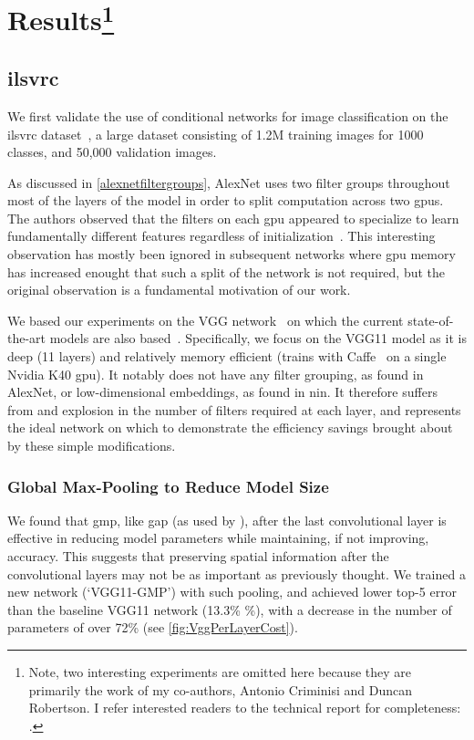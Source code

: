 \documentclass[thesis]{subfiles}
\begin{document}
	\section[Results]{Results\protect\footnote{Note, two interesting experiments are omitted here because they are primarily the work of my co-authors, Antonio Criminisi and Duncan Robertson. I refer interested readers to the technical report for completeness: \citet{Ioannou2015}.}}
	\subsection{\acrshort{ilsvrc}}
	We first validate the use of conditional networks for image classification on the \gls{ilsvrc} dataset~\citep{ILSVRC2015}, a large dataset consisting of 1.2M training images for 1000 classes, and 50,000 validation images.
	
	As discussed in \cref{alexnetfiltergroups}, AlexNet uses two filter groups throughout most of the layers of the model in order to split computation across two \gls{gpu}s. The authors observed that the filters on each \gls{gpu} appeared to specialize to learn fundamentally different features regardless of initialization~\citep{Krizhevsky2012}. This interesting observation has mostly been ignored in subsequent networks where \gls{gpu} memory has increased enought that such a split of the network is not required, but the original observation is a fundamental motivation of our work.
	
	We based our experiments on the VGG network~\citep{Simonyan2014verydeep} on which the current state-of-the-art models are also based~\citep{He2015b}. Specifically, we focus on the VGG11 model as it is deep (11 layers) and relatively memory efficient (trains with Caffe~\citep{Jia2014} on a single Nvidia K40 \gls{gpu}). It notably does not have any filter grouping, as found in AlexNet, or low-dimensional embeddings, as found in \gls{nin}. It therefore suffers from and explosion in the number of filters required at each layer, and represents the ideal network on which to demonstrate the efficiency savings brought about by these simple modifications.
	
	\subsubsection{Global Max-Pooling to Reduce Model Size}
	We found that \gls{gmp}, like \gls{gap} (as used by \citet{Lin2013NiN,Szegedy2014going}), after the last convolutional layer is effective in reducing model parameters while maintaining, if not improving, accuracy. This suggests that preserving spatial information after the convolutional layers may not be as important as previously thought. 
	We trained a new network (`VGG11-GMP') with such pooling, and achieved lower top-5 error than the baseline VGG11 
	network (13.3\% \%), with a decrease in the number of parameters of over 72\% (see \cref{fig:VggPerLayerCost}).
	
\end{document}
